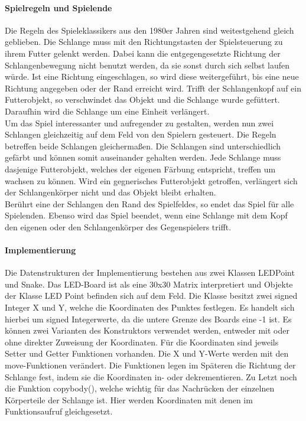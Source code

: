 \documentclass[12pt,a4paper]{article}
\begin{document}
\paragraph{Spielregeln und Spielende}
Die Regeln des Spieleklassikers aus den 1980er Jahren sind weitestgehend gleich geblieben. Die Schlange muss mit den Richtungstasten der Spielsteuerung zu ihrem Futter gelenkt werden. Dabei kann die entgegengesetzte Richtung der Schlangenbewegung nicht benutzt werden, da sie sonst durch sich selbst laufen würde. Ist eine Richtung eingeschlagen, so wird diese weitergeführt, bis eine neue Richtung angegeben oder der Rand erreicht wird. Trifft der Schlangenkopf auf ein Futterobjekt, so verschwindet das Objekt und die Schlange wurde gefüttert. Daraufhin wird die Schlange um eine Einheit verlängert.
\vspace{1.5ex}\\
Um das Spiel interessanter und aufregender zu gestalten, werden nun zwei Schlangen gleichzeitig auf dem Feld von den Spielern gesteuert. Die Regeln betreffen beide Schlangen gleichermaßen. Die Schlangen sind unterschiedlich gefärbt und können somit auseinander gehalten werden. Jede Schlange muss dasjenige Futterobjekt, welches der eigenen Färbung entspricht, treffen um wachsen zu können. Wird ein gegnerisches Futterobjekt getroffen, verlängert sich der Schlangenkörper nicht und das Objekt bleibt erhalten. 
\vspace{1.5ex}\\
Berührt eine der Schlangen den Rand des Spielfeldes, so endet das Spiel für alle Spielenden. Ebenso wird das Spiel beendet, wenn eine Schlange mit dem Kopf den eigenen oder den Schlangenkörper des Gegenspielers trifft. 

\paragraph{Implementierung}
Die Datenstrukturen der Implementierung bestehen aus zwei Klassen \glqq LEDPoint\grqq{} und \glqq Snake\grqq{}. Das LED-Board ist als eine 30x30 Matrix interpretiert und Objekte der Klasse LED Point befinden sich auf dem Feld. Die Klasse besitzt zwei signed Integer X und Y, welche die Koordinaten des Punktes festlegen. Es handelt sich hierbei um signed Integerwerte, da die untere Grenze des Boards eine -1 ist. Es können zwei Varianten des Konstruktors verwendet werden, entweder mit oder ohne direkter Zuweisung der Koordinaten. Für die Koordinaten sind jeweils Setter und Getter Funktionen vorhanden. Die X und Y-Werte werden mit den move-Funktionen verändert. Die Funktionen legen im Späteren die Richtung der Schlange fest, indem sie die Koordinaten in- oder dekrementieren. Zu Letzt noch die Funktion \glqq copybody()\grqq{}, welche wichtig für das Nachrücken der einzelnen Körperteile der Schlange ist. Hier werden Koordinaten mit denen im Funktionsaufruf gleichgesetzt. 
\end{document}
